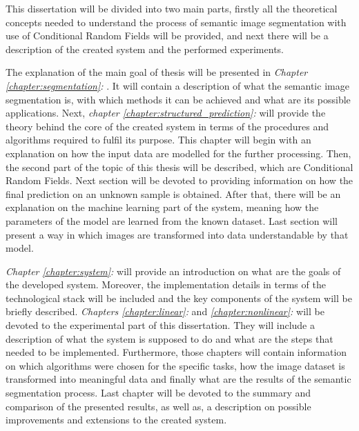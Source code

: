 This dissertation will be divided into two main parts, firstly all the theoretical concepts needed to understand the process of semantic image segmentation with use of Conditional Random Fields will be provided, and next there will be a description of the created system and the performed experiments.

The explanation of the main goal of thesis will be presented in 
\textit{Chapter \ref{chapter:segmentation}: }. It will contain a description of what the semantic image segmentation is, with which methods it can be achieved and what are its possible applications. Next, \textit{chapter \ref{chapter:structured_prediction}: } will provide the theory behind the core of the created system in terms of the procedures and algorithms required to fulfil its purpose. This chapter will begin with an explanation on how the input data are modelled for the further processing. Then, the second part of the topic of this thesis will be described, which are Conditional Random Fields. Next section will be devoted to providing information on how the final prediction on an unknown sample is obtained. After that, there will be an explanation on the machine learning part of the system, meaning how the parameters of the model are learned from the known dataset. Last section will present a way in which images are transformed into data understandable by that model. 

\textit{Chapter \ref{chapter:system}: } will provide an introduction on what are the goals of the developed system. Moreover, the implementation details in terms of the technological stack will be included and the key components of the system will be briefly described. \textit{Chapters \ref{chapter:linear}: } and \textit{\ref{chapter:nonlinear}: } will be devoted to the experimental part of this dissertation. They will include a description of what the system is supposed to do and what are the steps that needed to be implemented. Furthermore, those chapters will contain information on which algorithms were chosen for the specific tasks, how the image dataset is transformed into meaningful data and finally what are the results of the semantic segmentation process. Last chapter \textit{} will be devoted to the summary and comparison of the presented results, as well as, a description on possible improvements and extensions to the created system. 